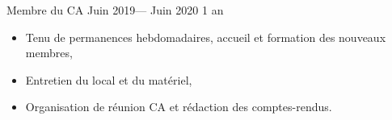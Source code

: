 \volunteerposition%
{Membre du CA}%
{Juin 2019--- Juin 2020}%
{1 an}%
{
	\begin{itemize}
    \item Tenu de permanences hebdomadaires, accueil et formation des nouveaux membres,
    \item Entretien du local et du matériel,
    \item Organisation de réunion CA et rédaction des comptes-rendus.
	\end{itemize}
}
